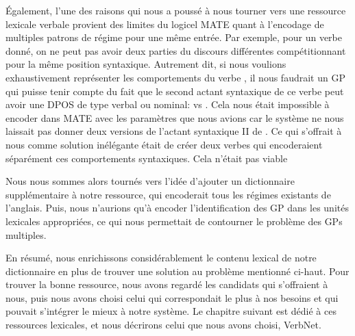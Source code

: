Également, l'une des raisons qui nous a poussé à nous tourner vers une ressource lexicale verbale provient des limites du logicel MATE quant à l'encodage de multiples patrons de régime pour une même entrée. Par exemple, pour un verbe donné, on ne peut pas avoir deux parties du discours différentes compétitionnant pour la même position syntaxique. Autrement dit, si nous voulions exhaustivement représenter les comportements du verbe , il nous faudrait un \ac{GP} qui puisse tenir compte du fait que le second actant syntaxique de ce verbe peut avoir une \ac{DPOS} de type verbal ou nominal:  vs . Cela nous était impossible à encoder dans MATE avec les paramètres que nous avions car le système ne nous laissait pas donner deux versions de l'actant syntaxique II de . Ce qui s'offrait à nous comme solution inélégante était de créer deux verbes  qui encoderaient séparément ces comportements syntaxiques. Cela n'était pas viable 

Nous nous sommes alors tournés vers l'idée d'ajouter un dictionnaire supplémentaire à notre ressource, qui encoderait tous les régimes existants de l'anglais. Puis, nous n'aurions qu'à encoder l'identification des \ac{GP} dans les unités lexicales appropriées, ce qui nous permettait de contourner le problème des \acp{GP} multiples.

En résumé, nous enrichissons considérablement le contenu lexical de notre dictionnaire en plus de trouver une solution au problème mentionné ci-haut. Pour trouver la bonne ressource, nous avons regardé les candidats qui s'offraient à nous, puis nous avons choisi celui qui correspondait le plus à nos besoins et qui pouvait s'intégrer le mieux à notre système. Le chapitre suivant est dédié à ces ressources lexicales, et nous décrirons celui que nous avons choisi, VerbNet.

